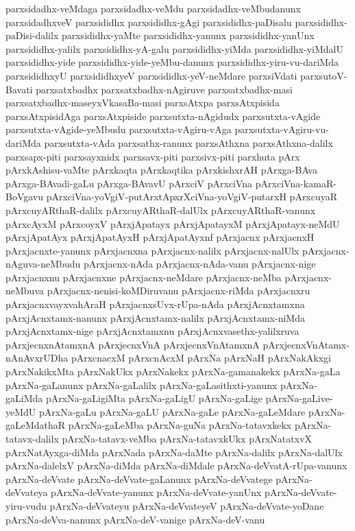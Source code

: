 {parxsidadhx-veMdaga
parxsidadhx-veMdu
parxsidadhx-veMbudanunx
parxsidadhxveV
parxsididhx
parxsididhx-gAgi
parxsididhx-paDisalu
parxsididhx-paDisi-dalilx
parxsididhx-yaMte
parxsididhx-yanunx
parxsididhx-yanUnx
parxsididhx-yalilx
parxsididhx-yA-galu
parxsididhx-yiMda
parxsididhx-yiMdalU
parxsididhx-yide
parxsididhx-yide-yeMbu-danunx
parxsididhx-yiru-vu-dariMda
parxsididhxyU
parxsididhxyeV
parxsididhx-yeV-neMdare
parxsiVdati
parxsutoV-Bavati
parxsatxbadhx
parxsatxbadhx-nAgiruve
parxsatxbadhx-masi
parxsatxbadhx-maseyxVkasaBa-masi
parxsAtxpa
parxsAtxpisida
parxsAtxpisidAga
parxsAtxpiside
parxsutxta-nAgidudx
parxsutxta-vAgide
parxsutxta-vAgide-yeMbudu
parxsutxta-vAgiru-vAga
parxsutxta-vAgiru-vu-dariMda
parxsutxta-vAda
parxsathx-ranunx
parxsAthxna
parxsAthxna-dalilx
parxsapx-piti
parxsayxnidx
parxsavx-piti
parxsivx-piti
parxhuta
pArx
pArxkAshisu-vaMte
pArxkaqta
pArxkaqtika
pArxkishxrAH
pArxga-BAva
pArxga-BAvadi-gaLu
pArxga-BAvavU
pArxciV
pArxciVna
pArxciVna-kamaR-BoVgavu
pArxciVna-yoVgiV-putArxtApxrXciVna-yoVgiV-putarxH
pArxcuyaR
pArxcuyARthaR-dalilx
pArxcuyARthaR-dalUlx
pArxcuyARthaR-vanunx
pArxcAyxM
pArxcoyxV
pArxjApatayx
pArxjApatayxM
pArxjApatayx-neMdU
pArxjApatAyx
pArxjApatAyxH
pArxjApatAyxnf
pArxjacnx
pArxjacnxH
pArxjacnxte-yanunx
pArxjacnxna
pArxjacnx-nalilx
pArxjacnx-nalUlx
pArxjacnx-nAguva-neMbudu
pArxjacnx-nAda
pArxjacnx-nAda-vanu
pArxjacnx-nige
pArxjacnxnu
pArxjacnxne
pArxjacnx-neMdare
pArxjacnx-neMba
pArxjacnx-neMbuva
pArxjacnx-nenisi-koMDiruvanu
pArxjacnx-riMda
pArxjacnxru
pArxjacnxvayxvahAraH
pArxjacnxsUvx-rUpa-nAda
pArxjAcnxtamxna
pArxjAcnxtamx-nanunx
pArxjAcnxtamx-nalilx
pArxjAcnxtamx-niMda
pArxjAcnxtamx-nige
pArxjAcnxtamxnu
pArxjAcnxvasethx-yalilxruva
pArxjecnxnAtamxnA
pArxjecnxVnA
pArxjecnxVnAtamxnA
pArxjecnxVnAtamx-nAnAvxrUDha
pArxcnacxM
pArxcnAcxM
pArxNa
pArxNaH
pArxNakAkxgi
pArxNakikxMta
pArxNakUkx
pArxNakekx
pArxNa-gamanakekx
pArxNa-gaLa
pArxNa-gaLanunx
pArxNa-gaLalilx
pArxNa-gaLasithxti-yanunx
pArxNa-gaLiMda
pArxNa-gaLigiMta
pArxNa-gaLigU
pArxNa-gaLige
pArxNa-gaLive-yeMdU
pArxNa-gaLu
pArxNa-gaLU
pArxNa-gaLe
pArxNa-gaLeMdare
pArxNa-gaLeMdathaR
pArxNa-gaLeMba
pArxNa-guNa
pArxNa-tatavxkekx
pArxNa-tatavx-dalilx
pArxNa-tatavx-veMba
pArxNa-tatavxkUkx
pArxNatatxvX
pArxNatAyxga-diMda
pArxNada
pArxNa-daMte
pArxNa-dalilx
pArxNa-dalUlx
pArxNa-dalelxV
pArxNa-diMda
pArxNa-diMdale
pArxNa-deVvatA-rUpa-vanunx
pArxNa-deVvate
pArxNa-deVvate-gaLanunx
pArxNa-deVvatege
pArxNa-deVvateya
pArxNa-deVvate-yanunx
pArxNa-deVvate-yanUnx
pArxNa-deVvate-yiru-vudu
pArxNa-deVvateyu
pArxNa-deVvateyeV
pArxNa-deVvate-yoDane
pArxNa-deVva-nanunx
pArxNa-deV-vanige
pArxNa-deV-vanu
}
